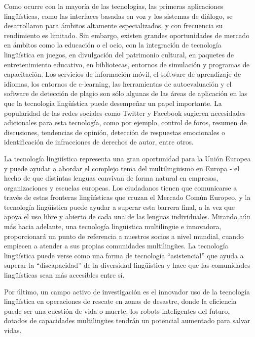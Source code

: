 \begin{multicols}{2}
Como ocurre con la mayoría de las tecnologías, las primeras aplicaciones lingüísticas, como las interfaces basadas en voz y los sistemas de diálogo, se desarrollaron para ámbitos altamente especializados, y con frecuencia su rendimiento es limitado. Sin embargo, existen grandes oportunidades de mercado en ámbitos como la educación o el ocio, con la integración de tecnología lingüística en juegos, en divulgación del patrimonio cultural, en paquetes de entretenimiento educativo, en bibliotecas, entornos de simulación y programas de capacitación. Los servicios de información móvil, el software de aprendizaje de idiomas, los entornos de e-learning, las herramientas de autoevaluación y el software de detección de plagio son sólo algunas de las áreas de aplicación en las que la tecnología lingüística puede desempeñar un papel importante. La popularidad de las redes sociales como Twitter y Facebook sugieren necesidades adicionales para esta tecnología, como por ejemplo, control de foros, resumen de discusiones, tendencias de opinión, detección de respuestas emocionales o identificación de  infracciones de derechos de autor, entre otros.


La tecnología lingüística representa una gran oportunidad para la Unión Europea y puede ayudar a abordar el complejo tema del multilingüismo en Europa - el hecho de que distintas lenguas convivan de forma natural en empresas, organizaciones y escuelas europeas. Los ciudadanos tienen que comunicarse a través de estas fronteras lingüísticas que cruzan el Mercado Común Europeo, y la tecnología lingüística puede ayudar a superar esta barrera final, a la vez que apoya el uso libre y abierto de cada una de las lenguas individuales. Mirando aún más hacia adelante, una tecnología lingüística multilingüe e innovadora, proporcionará un punto de referencia a nuestros socios a nivel mundial, cuando empiecen a atender a sus propias comunidades multilingües. La tecnología lingüística puede verse como una forma de tecnología ``asistencial'' que ayuda a superar la ``discapacidad'' de la diversidad lingüística y hace que las comunidades lingüísticas sean más accesibles entre sí.

Por último, un campo activo de investigación es el innovador uso de la tecnología lingüística en operaciones de rescate en zonas de desastre, donde la eficiencia puede ser una cuestión de vida o muerte: los robots inteligentes del futuro, dotados de capacidades multilingües tendrán un potencial aumentado para salvar vidas.


\end{multicols}
